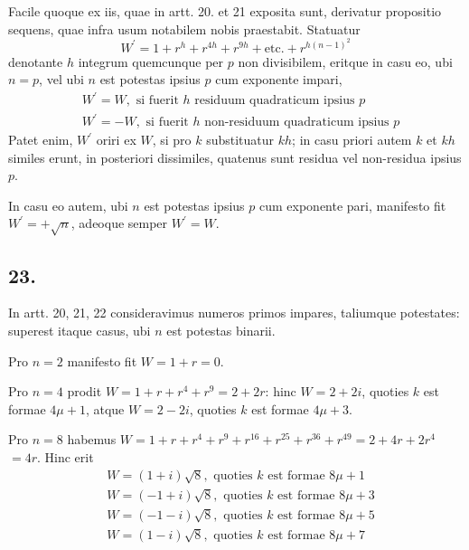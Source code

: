 \documentclass[twoside,12pt, showframe]{memoir}
\begin{document}
Facile quoque ex iis, quae in artt. 20. et 21 exposita sunt, derivatur propositio sequens, quae infra usum notabilem nobis praestabit. Statuatur
\[W^{\prime}=1+r^{h}+r^{4 h}+r^{9 h}+\text{etc.}+r^{h(n-1)^{2}}\]\clearpage\noindent%
denotante \(h\) integrum quemcunque per \(p\) non divisibilem, eritque in casu eo, ubi \(n=p\), vel ubi \(n\) est potestas ipsius \(p\) cum exponente impari,
\[\begin{aligned}
& W^{\prime}=W, \text{ si fuerit } h \text{ residuum quadraticum ipsius } p \\
& W^{\prime}=-W, \text{ si fuerit } h \text{ non-residuum quadraticum ipsius } p
\end{aligned}\]
Patet enim, \(W^{\prime}\) oriri ex \(W\), si pro \(k\) substituatur \(k h\); in casu priori autem \(k\) et \(k h\) similes erunt, in posteriori dissimiles, quatenus sunt residua vel non-residua ipsius \(p\).
 
In casu eo autem, ubi \(n\) est potestas ipsius \(p\) cum exponente pari, manifesto fit \(W^{\prime}=+\surd n\), adeoque semper \(W^{\prime}=W\).

\subsection*{23.}
 
In artt. 20, 21, 22 consideravimus numeros primos impares, taliumque potestates: superest itaque casus, ubi \(n\) est potestas binarii.
 
Pro \(n=2\) manifesto fit \(W=1+r=0\).
 
Pro \(n=4\) prodit \(W=1+r+r^{4}+r^{9}=2+2 r\): hinc \(W=2+2 i\), quoties \(k\) est formae \(4 \mu+1\), atque \(W=2-2 i\), quoties \(k\) est formae \(4 \mu+3\).
 
Pro \(n=8\) habemus \(W=1+r+r^{4}+r^{9}+r^{16}+r^{25}+r^{36}+r^{49}=2+4 r+2 r^{4}\) \(=4 r\). Hinc erit
\[\begin{aligned}
& W=(1+i) \surd 8, \text{ quoties } k \text{ est formae } 8 \mu+1 \\
& W=(-1+i) \surd 8, \text{ quoties } k \text{ est formae } 8 \mu+3 \\
& W=(-1-i) \surd 8, \text{ quoties } k \text{ est formae } 8 \mu+5 \\
& W=(1-i) \surd 8, \text{ quoties } k \text{ est formae } 8 \mu+7
\end{aligned}\]
\end{document}
